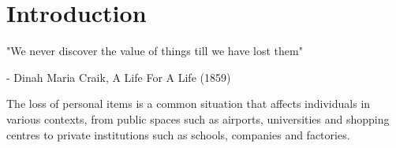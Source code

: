 \chapter{Introduction}
\label{chapter:introduction}

\begin{introduction}
"We never discover the value of things till we have lost them"

- Dinah Maria Craik, A Life For A Life (1859)
\end{introduction}


The loss of personal items is a common situation that affects individuals in various contexts, from public spaces such as airports, universities and shopping centres \cites{Oke2017, Yao2019} to private institutions such as schools, companies and factories.

